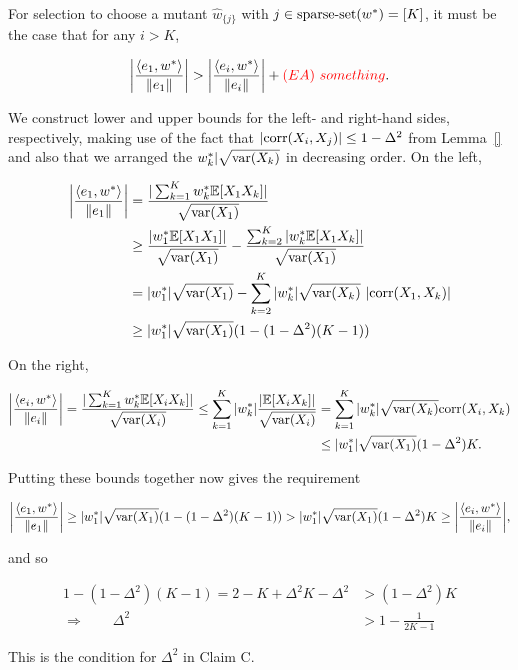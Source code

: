 For selection to choose a mutant $\hat{w}_{\{j\}}$ with
$j \in \mathrm{sparse\mbox{-}set}(w^*) = [K]$, it must be the case that for any $i > K$,

\[
\bigg\vert \frac{\langle e_1, w^* \rangle}{\Vert e_1 \Vert} \bigg\vert
> \bigg\vert \frac{\langle e_i, w^* \rangle}{\Vert e_i \Vert} \bigg\vert + {\color{red} (EA) ~something}.
\]

We construct lower and upper bounds for the left- and right-hand sides,
respectively, making use of the fact that
$|\mathrm{corr}(X_i, X_j)| \leq 1 - \Delta^2$ from Lemma~\ref{} and also
that we arranged the $w^*_k \vert \sqrt{\mathrm{var}(X_k)}$ in decreasing order.
On the left,

\begin{align*}
\bigg\vert \frac{\langle e_1, w^* \rangle}{\Vert e_1 \Vert} \bigg\vert
&= \frac{\vert\sum_{k=1}^K w^*_k \mathbb{E}[X_1 X_k]\vert}{\sqrt{\mathrm{var}(X_1)}} \\
&\ge \frac{\vert w^*_1 \mathbb{E}[X_1 X_1]\vert}{\sqrt{\mathrm{var}(X_1)}} - \frac{\sum_{k=2}^K \vert w^*_k \mathbb{E}[X_1 X_k] \vert}{\sqrt{\mathrm{var}(X_1)}} \\
&= \vert w^*_1 \vert \sqrt{\mathrm{var}(X_1)} - \sum_{k=2}^K \vert w^*_k \vert \sqrt{\mathrm{var}(X_k)}~\vert \mathrm{corr}(X_1, X_k) \vert \\
&\ge \vert w^*_1 \vert \sqrt{\mathrm{var}(X_1)}(1 - (1 - \Delta^2) (K-1))
\end{align*}

\noindent On the right,

\begin{align*}
\bigg\vert \frac{\langle e_i, w^* \rangle}{\Vert e_i \Vert} \bigg\vert
= \frac{\vert\sum_{k=1}^K w^*_k \mathbb{E}[X_i X_k]\vert}{\sqrt{\mathrm{var}(X_i)}}
\le \sum_{k=1}^K \vert w^*_k \vert \frac{\vert \mathbb{E}[X_i X_k]\vert}{\sqrt{\mathrm{var}(X_i)}}
&= \sum_{k=1}^K \vert w^*_k \vert \sqrt{\mathrm{var}(X_k)} \mathrm{corr}(X_i, X_k) \\
&\le \vert w^*_1 \vert \sqrt{\mathrm{var}(X_1)} (1 - \Delta^2) K.
\end{align*}

\noindent Putting these bounds together now gives the requirement

\[
\bigg\vert \frac{\langle e_1, w^* \rangle}{\Vert e_1 \Vert} \bigg\vert
\ge \vert w^*_1 \vert \sqrt{\mathrm{var}(X_1)}(1 - (1 - \Delta^2) (K-1))
> \vert w^*_1 \vert \sqrt{\mathrm{var}(X_1)} (1 - \Delta^2) K
\ge \bigg\vert \frac{\langle e_i, w^* \rangle}{\Vert e_i \Vert} \bigg\vert,
\]

\noindent and so

\begin{align*}
1 - (1 - \Delta^2) (K-1) = 2 - K + \Delta^2 K - \Delta^2 &> (1 - \Delta^2) K \\
\Rightarrow \qquad \Delta^2 &> 1 - \frac{1}{2 K - 1}
\end{align*}

\noindent  This is the condition for $\Delta^2$ in Claim C.
